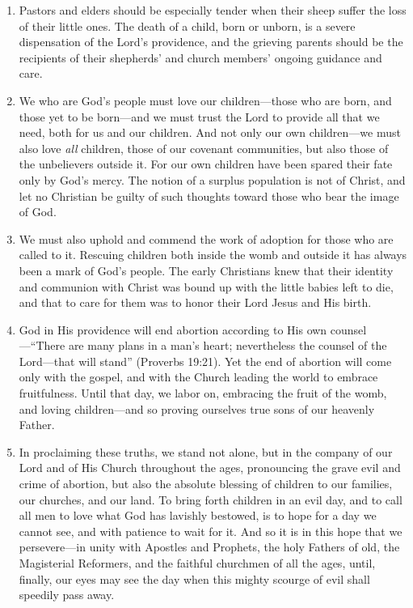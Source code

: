\documentclass[
]{book}
\begin{document}
\begin{enumerate}
\def\labelenumi{\arabic{enumi}.}
\setcounter{enumi}{18}
\item
  Pastors and elders should be especially tender when their sheep suffer the loss of their little ones. The death of a child, born or unborn, is a severe dispensation of the Lord's providence, and the grieving parents should be the recipients of their shepherds' and church members' ongoing guidance and care.
\item
  We who are God's people must love our children---those who are born, and those yet to be born---and we must trust the Lord to provide all that we need, both for us and our children. And not only our own children---we must also love \emph{all} children, those of our covenant communities, but also those of the unbelievers outside it. For our own children have been spared their fate only by God's mercy. The notion of a surplus population is not of Christ, and let no Christian be guilty of such thoughts toward those who bear the image of God.
\item
  We must also uphold and commend the work of adoption for those who are called to it. Rescuing children both inside the womb and outside it has always been a mark of God's people. The early Christians knew that their identity and communion with Christ was bound up with the little babies left to die, and that to care for them was to honor their Lord Jesus and His birth.
\item
  God in His providence will end abortion according to His own counsel---``There are many plans in a man's heart; nevertheless the counsel of the Lord---that will stand'' (Proverbs 19:21). Yet the end of abortion will come only with the gospel, and with the Church leading the world to embrace fruitfulness. Until that day, we labor on, embracing the fruit of the womb, and loving children---and so proving ourselves true sons of our heavenly Father.
\item
  In proclaiming these truths, we stand not alone, but in the company of our Lord and of His Church throughout the ages, pronouncing the grave evil and crime of abortion, but also the absolute blessing of children to our families, our churches, and our land. To bring forth children in an evil day, and to call all men to love what God has lavishly bestowed, is to hope for a day we cannot see, and with patience to wait for it. And so it is in this hope that we persevere---in unity with Apostles and Prophets, the holy Fathers of old, the Magisterial Reformers, and the faithful churchmen of all the ages, until, finally, our eyes may see the day when this mighty scourge of evil shall speedily pass away.
\end{enumerate}
\end{document}
